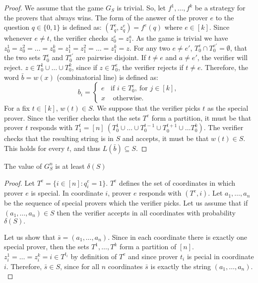 \begin{proof}
We assume that the game $G_S$ is trivial. So, let $f^1, \ldots, f^k$ be a strategy for the provers that always wins. The form of the answer of the prover $e$ to the question $q \in \{0,1\}$ is defined as: $(T_q^e, z_q^e)=f^e(q)$ where $e \in [k]$.  Since whenever $e \neq t$, the verifier checks $z_0^e=z_1^a$. As the game is trivial we have $z_0^1=z_0^2= \ldots=z_0^k=z_1^1=z_1^2= \ldots=z_1^k=z$. 
For any two $e\neq e'$, $T_0^e \cap T_0^{e'}= \emptyset$, that the two sets $T_0^e $ and $T_0^{e'}$ are pairwise disjoint. If $t \neq e$ and $a\neq e'$, the verifier will reject.
$z \in T_0^1 \cup \ldots \cup T_0^k$, since if $z \in T_0^e$, the verifier rejects if $t \neq e$. Therefore, the word $\bar{b}=w(x)$ (combinatorial line)  is defined as: $$b_i=\left\lbrace \begin{array}{ll} e & \text{if } i \in T_0^e, \ \text{for }j \in [k], \\ x & \text{ otherwise}.\end{array} \right.$$
For a fix $t \in [k]$, $w(t) \in S.$ We suppose that  the verifier picks $t$ as the special prover. Since the verifier checks that the sets $T^e$ form a partition, it must be that prover $t$ responds with $T_1^t=[n] \ \left(T_0^1 \cup \ldots \cup T_0^{t-1} \cup T_0^{t+1} \cup \ldots T_0^k	 \right) .$ The verifier checks that the resulting string is in $S$ and accepts, it must be that $w(t) \in S.$ This holds for every $t$, and thus $L(\bar{b}) \subseteq S.$
\end{proof}

\begin{pro}	 The value of $G_S^n$ is at least $\delta(S)$	  \label{pr3} \end{pro}

\begin{proof}
Let  $T^e=\{i \in [n]: q_i^e=1\}$. $T^e$ defines the set of coordinates in which prover $e$ is special. In coordinate $i$, prover $e$ responds with $(T^e,i).$ Let $a_1, \ldots, a_n$ be the sequence of special provers which the verifier picks. Let us assume that if $(a_1, \ldots, a_n) \in S$ then the verifier accepts in all coordinates with probability $\delta(S).$ 

Let us show that $\bar{s}=(a_1, \ldots, a_n) $. Since in each coordinate there is exactly one special prover, then the sets $T^1, \ldots, T^k$ form a partition of $[n]$. $z_i^1=\ldots=z_i^k=i \in T^{t_i}$ by definition of $T^e$ and since prover $t_i$ is pecial in coordinate $i.$ Therefore, $\bar{s} \in S$, since for all $n$ coordinates $\bar{s}$ is exactly the string $(a_1, \ldots, a_n).$
\end{proof}

